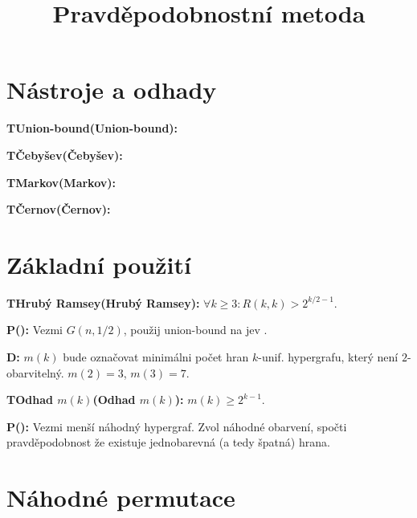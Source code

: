 \def\begintext{\par\leavevmode\begingroup\parskip0pt\rm}
\def\endtext{\endgroup}

\itemindent=0.15in
\itemnarrow=0in


\def\dfn{
{\color{red} \bf D:}
}

\def\prfcolor{\color{green}}
\def\thmcolor{\color{blue}}
\def\lemcolor{\color[rgb]{1,0,1}}

\def\prf#1{{\bf \begingroup\prfcolor P\ifx#1\empty\else(\endgroup{\I #1}\begingroup\prfcolor)\fi:\endgroup}}
\def\thm#1{{\bf \begingroup\thmcolor T\ifx#1\empty\else(\endgroup{\I #1}\begingroup\thmcolor)\fi:\endgroup}}
\def\lem#1{{\bf \begingroup\lemcolor L\ifx#1\empty\else(\endgroup{\I #1}\begingroup\lemcolor)\fi:\endgroup}}

\def\st{{\rm\ t.ž.\ }}

\title{Pravděpodobnostní metoda}

\section{Nástroje a odhady}

\thm{Union-bound}

\thm{Čebyšev}

\thm{Markov}

\thm{Černov}

\section{Základní použití}

\thm{Hrubý Ramsey} $\forall k \ge 3: R(k,k) > 2^{k/2 - 1}$.

\prf{} Vezmi $G(n,1/2)$, použij union-bound na jev .

\dfn $m(k)$ bude označovat minimálni počet hran $k$-unif. hypergrafu, který není
$2$-obarvitelný. $m(2) = 3$, $m(3) = 7$.

\thm{Odhad $m(k)$} $m(k) \ge 2^{k-1}$.

\prf{} Vezmi menší náhodný hypergraf. Zvol náhodné obarvení, spočti pravděpodobnost
že existuje jednobarevná (a tedy špatná) hrana.

\section{Náhodné permutace}

